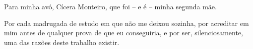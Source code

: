 Para minha avó, Cícera Monteiro, que foi -- e é -- minha segunda mãe.

Por cada madrugada de estudo em que não me deixou sozinha,
por acreditar em mim antes de qualquer prova de que eu conseguiria,
e por ser, silenciosamente, uma das razões deste trabalho existir.
